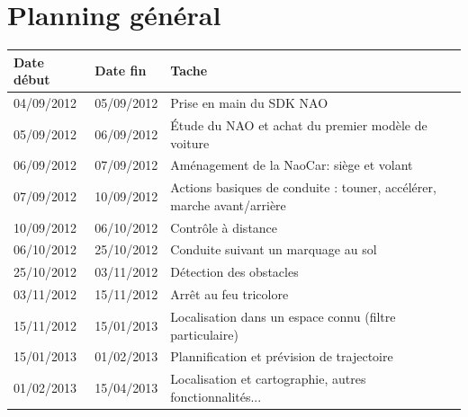 \documentclass[11pt]{report} %
\begin{document}
	\section{Planning général}
		\begin{tabular}{|l|l|l|}
			\hline
			Date début & Date fin & Tache\\ \hline
			04/09/2012 & 05/09/2012 & Prise en main du SDK NAO\\ \hline
			05/09/2012 & 06/09/2012 & Étude du NAO et achat du premier modèle de voiture\\ \hline
			06/09/2012 & 07/09/2012 & Aménagement de la NaoCar: siège et volant\\ \hline
			07/09/2012 & 10/09/2012 & Actions basiques de conduite : touner, accélérer, marche avant/arrière\\ \hline
			10/09/2012 & 06/10/2012 & Contrôle à distance\\ \hline
			06/10/2012 & 25/10/2012 & Conduite suivant un marquage au sol\\ \hline
			25/10/2012 & 03/11/2012 & Détection des obstacles\\ \hline
			03/11/2012 & 15/11/2012 & Arrêt au feu tricolore\\ \hline
			15/11/2012 & 15/01/2013 & Localisation dans un espace connu (filtre particulaire)\\ \hline
			15/01/2013 & 01/02/2013 & Plannification et prévision de trajectoire\\ \hline
			01/02/2013 & 15/04/2013 & Localisation et cartographie, autres fonctionnalités...\\ \hline
			\end{tabular}
\end{document}
